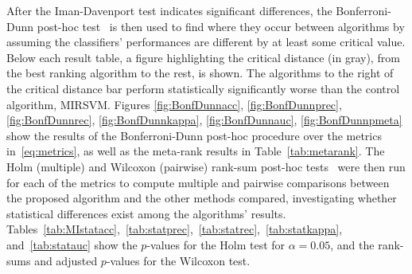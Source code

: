 \documentclass[reqno]{vcuthesis}
\numberwithin{equation}{chapter}
\begin{document}
After the Iman-Davenport test indicates significant differences, the Bonferroni-Dunn post-hoc test~\cite{Dunn1961} is then used to find where they occur between algorithms by assuming the classifiers' performances are different by at least some critical value. Below each result table, a figure highlighting the critical distance (in gray), from the best ranking algorithm to the rest, is shown. The algorithms to the right of the critical distance bar perform statistically significantly worse than the control algorithm, MIRSVM. Figures \ref{fig:BonfDunnacc}, \ref{fig:BonfDunnprec}, \ref{fig:BonfDunnrec}, \ref{fig:BonfDunnkappa}, \ref{fig:BonfDunnauc}, \ref{fig:BonfDunnpmeta} show the results of the Bonferroni-Dunn post-hoc procedure over the metrics in~\eqref{eq:metrics}, as well as the meta-rank results in Table~\ref{tab:metarank}. The Holm (multiple) and Wilcoxon (pairwise) rank-sum post-hoc tests~\cite{Holander1999} were then run for each of the metrics to compute multiple and pairwise comparisons between the proposed algorithm and the other methods compared, investigating whether statistical differences exist among the algorithms' results. Tables~\ref{tab:MIstatacc},~\ref{tab:statprec},~\ref{tab:statrec},~\ref{tab:statkappa}, and~\ref{tab:statauc} show the $p$-values for the Holm test for $\alpha = 0.05$, and the rank-sums and adjusted $p$-values for the Wilcoxon test.
\end{document}
